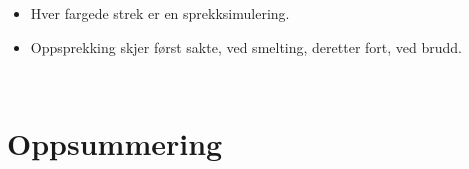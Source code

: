 \documentclass[utf8x, notes, graphics]{beamer}
\begin{document}
\begin{frame}
\frametitle{}
\begin{columns}
\begin{itemize}
\item Hver fargede strek er en sprekksimulering.
\item Oppsprekking skjer først sakte, ved smelting, deretter fort, ved brudd.
\end{itemize}
\end{columns}

\end{frame}


\section{Oppsummering}
\end{document}
